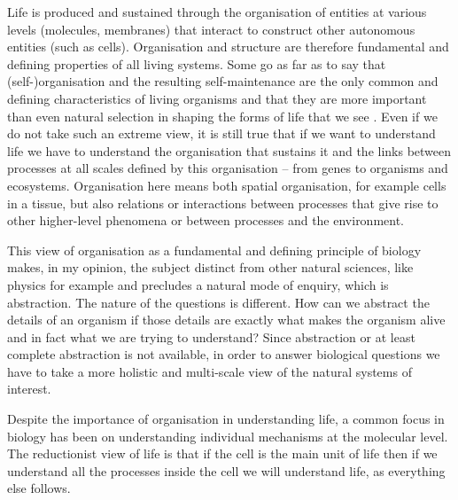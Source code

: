 Life is produced and sustained through the organisation of entities at various
levels (\eg molecules, membranes) that interact to construct other autonomous
entities (such as cells). Organisation and structure are therefore fundamental
and defining properties of all living systems. Some go as far as to say that
(self-)organisation and the resulting self-maintenance are the only common and
defining characteristics of living organisms and that they are more important
than even natural selection in shaping the forms of life that we see
\citep[sometimes referred to as structuralism, for
example;][]{thompson1942growth, kauffman1992origins}. Even if we do not take
such an extreme view, it is still true that if we want to understand life we
have to understand the organisation that sustains it and the links between
processes at all scales defined by this organisation -- from genes to organisms
and ecosystems. Organisation here means both spatial organisation, for example
cells in a tissue, but also relations or interactions between processes that
give rise to other higher-level phenomena or between processes and the
environment.

This view of organisation as a fundamental and defining principle of biology
makes, in my opinion, the subject distinct from other natural sciences, like
physics for example and precludes a natural mode of enquiry, which is
abstraction. The nature of the questions is different. How can we abstract the
details of an organism if those details are exactly what makes the organism
alive and in fact what we are trying to understand? Since abstraction or at
least complete abstraction is not available, in order to answer biological
questions we have to take a more holistic and multi-scale view of the natural
systems of interest.

Despite the importance of organisation in understanding life, a common focus in
biology has been on understanding individual mechanisms at the molecular
level. The reductionist view of life is that if the cell is the main unit of
life then if we understand all the processes inside the cell we will understand
life, as everything else follows.

